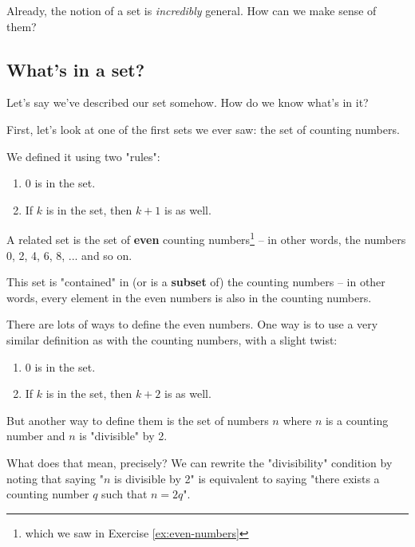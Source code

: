 Already, the notion of a set is \emph{incredibly} general. How can we make sense of them?


\subsection{What's in a set?}


Let's say we've described our set somehow. How do we know what's in it?

First, let's look at one of the first sets we ever saw: the set of counting numbers. 

We defined it using two "rules":
\begin{enumerate}
\item 0 is in the set.
\item If $k$ is in the set, then $k+1$ is as well. 
\end{enumerate}
\hfill


A related set is the set of \textbf{even} counting numbers\footnote{which we saw in Exercise \ref{ex:even-numbers}} -- in other words, the numbers 0, 2, 4, 6, 8, ... and so on.

This set is "contained" in (or is a \textbf{subset} of) the counting numbers -- in other words, every element in the even numbers is also in the counting numbers.

There are lots of ways to define the even numbers. One way is to use a very similar definition as with the counting numbers, with a slight twist:
\begin{enumerate}
\item 0 is in the set.
\item If $k$ is in the set, then $k+2$ is as well. 
\end{enumerate}

But another way to define them is the set of numbers $n$ where $n$ is a counting number and $n$ is "divisible" by 2. 

What does that mean, precisely? We can rewrite the "divisibility" condition by noting that saying "$n$ is divisible by 2" is equivalent to saying "there exists a counting number $q$ such that $n = 2q$". 

